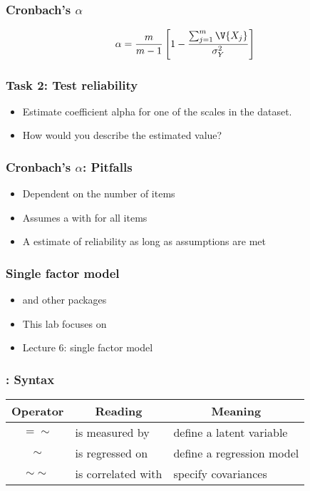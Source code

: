 \documentclass[compress]{beamer}\usepackage[]{graphicx}\usepackage[]{xcolor}
\begin{document}
\begin{frame}[fragile]
	\frametitle{Cronbach's $\alpha$}
		\[ \alpha = \frac{m}{m-1} \left[ 1 - \frac{\sum_{j=1}^m \V{X_j}}{\sigma_Y^2} \right] \]
\end{frame}


\begin{frame}[fragile]
	\frametitle{Task 2: Test reliability}
		\begin{itemize}
			\item Estimate coefficient alpha for one of the scales in the  dataset.
			\item How would you describe the estimated value?
		\end{itemize}
\end{frame}


\begin{frame}[fragile]
	\frametitle{Cronbach's $\alpha$: Pitfalls}
		\begin{itemize}
			\item Dependent on the number of items
			\item Assumes a  with  for all items
			\item A  estimate of reliability as long as assumptions are met
		\end{itemize}
\end{frame}


\begin{frame}[fragile]
	\frametitle{Single factor model}
		\begin{itemize}
			\item {} and other \cR packages
			\item This lab focuses on 
			\item Lecture 6: single factor model
		\end{itemize}
\end{frame}


\begin{frame}[fragile]
	\frametitle{: Syntax}
		\begin{center}
			\begin{tabular}{cll}
				\hline
				Operator  & \multicolumn{1}{c}{Reading} & \multicolumn{1}{c}{Meaning}  \\
				\hline
				$=\sim$ & is measured by & define a latent variable \\
				$\sim$ & is regressed on & define a regression model \\
				$\sim\sim$ & is correlated with & specify covariances \\
				\hline
			\end{tabular}
		\end{center}
\end{frame}
\end{document}
